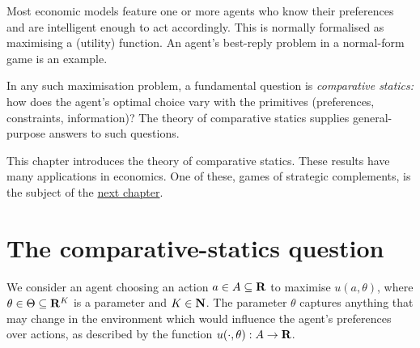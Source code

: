 




Most economic models feature one or more agents who know their preferences and are intelligent enough to act accordingly. This is normally formalised as maximising a (utility) function. An agent's best-reply problem in a normal-form game is an example.

In any such maximisation problem, a fundamental question is \emph{comparative statics:} how does the agent's optimal choice vary with the primitives (preferences, constraints, information)? The theory of comparative statics supplies general-purpose answers to such questions.

This chapter introduces the theory of comparative statics. These results have many applications in economics. One of these, games of strategic complements, is the subject of the \hyperref[ch_spm]{next chapter}.



\section{The comparative-statics question}
\label{mcs:question}

We consider an agent choosing an action $a \in A \subseteq \mathbf{R}$ to maximise $u(a,\theta)$, where $\theta \in \Theta \subseteq \mathbf{R}^K$ is a parameter and $K \in \mathbf{N}$. The parameter $\theta$ captures anything that may change in the environment which would influence the agent's preferences over actions, as described by the function $u(\cdot,\theta) : A \to \mathbf{R}$.

